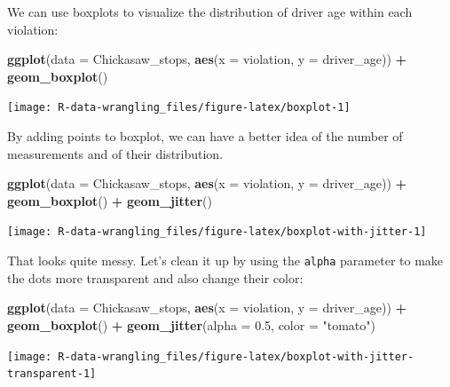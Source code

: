 \documentclass[]{book}
\newenvironment{Shaded}{\begin{snugshade}}{\end{snugshade}}
\newcommand{\KeywordTok}[1]{\textcolor[rgb]{0.13,0.29,0.53}{\textbf{#1}}}
\newcommand{\DataTypeTok}[1]{\textcolor[rgb]{0.13,0.29,0.53}{#1}}
\newcommand{\FloatTok}[1]{\textcolor[rgb]{0.00,0.00,0.81}{#1}}
\newcommand{\StringTok}[1]{\textcolor[rgb]{0.31,0.60,0.02}{#1}}
\newcommand{\OperatorTok}[1]{\textcolor[rgb]{0.81,0.36,0.00}{\textbf{#1}}}
\newcommand{\NormalTok}[1]{#1}
\theoremstyle{definition}
\theoremstyle{definition}
\theoremstyle{definition}
\theoremstyle{remark}
\begin{document}
We can use boxplots to visualize the distribution of driver age within
each violation:

\begin{Shaded}
\begin{Highlighting}[]
\KeywordTok{ggplot}\NormalTok{(}\DataTypeTok{data =}\NormalTok{ Chickasaw_stops, }\KeywordTok{aes}\NormalTok{(}\DataTypeTok{x =}\NormalTok{ violation, }\DataTypeTok{y =}\NormalTok{ driver_age)) }\OperatorTok{+}
\StringTok{    }\KeywordTok{geom_boxplot}\NormalTok{()}
\end{Highlighting}
\end{Shaded}

\texttt{[image: R-data-wrangling\_files/figure-latex/boxplot-1]}

By adding points to boxplot, we can have a better idea of the number of
measurements and of their distribution.

\begin{Shaded}
\begin{Highlighting}[]
\KeywordTok{ggplot}\NormalTok{(}\DataTypeTok{data =}\NormalTok{ Chickasaw_stops, }\KeywordTok{aes}\NormalTok{(}\DataTypeTok{x =}\NormalTok{ violation, }\DataTypeTok{y =}\NormalTok{ driver_age)) }\OperatorTok{+}
\StringTok{    }\KeywordTok{geom_boxplot}\NormalTok{() }\OperatorTok{+}
\StringTok{    }\KeywordTok{geom_jitter}\NormalTok{()}
\end{Highlighting}
\end{Shaded}

\texttt{[image: R-data-wrangling\_files/figure-latex/boxplot-with-jitter-1]}

That looks quite messy. Let's clean it up by using the \texttt{alpha}
parameter to make the dots more transparent and also change their color:

\begin{Shaded}
\begin{Highlighting}[]
\KeywordTok{ggplot}\NormalTok{(}\DataTypeTok{data =}\NormalTok{ Chickasaw_stops, }\KeywordTok{aes}\NormalTok{(}\DataTypeTok{x =}\NormalTok{ violation, }\DataTypeTok{y =}\NormalTok{ driver_age)) }\OperatorTok{+}
\StringTok{    }\KeywordTok{geom_boxplot}\NormalTok{() }\OperatorTok{+}
\StringTok{    }\KeywordTok{geom_jitter}\NormalTok{(}\DataTypeTok{alpha =} \FloatTok{0.5}\NormalTok{, }\DataTypeTok{color =} \StringTok{"tomato"}\NormalTok{)}
\end{Highlighting}
\end{Shaded}

\texttt{[image: R-data-wrangling\_files/figure-latex/boxplot-with-jitter-transparent-1]}
\end{document}
